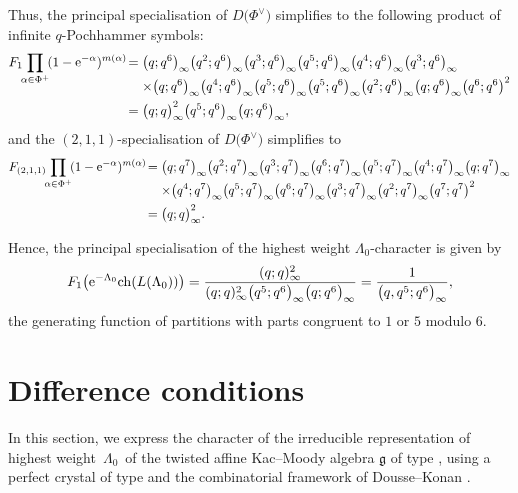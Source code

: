 \documentclass[10pt,a4paper]{amsart}
\numberwithin{equation}{section}
\theoremstyle{definition}
\begin{document}
Thus, the principal specialisation of $D\bigl(\Phi^\vee\bigr)$ simplifies to the following product of infinite $q$-Pochhammer symbols:
\begin{align*}
F_1\!\! \prod_{\alpha \in \Phi^+}\! (1 - {\rm e}^{-\alpha} )^{m(\alpha)}\!
={}&
\bigl(q;q^6\bigr)_{\infty} \bigl(q^2;q^6\bigr)_{\infty} \bigl(q^3;q^6\bigr)_{\infty} \bigl(q^5;q^6\bigr)_{\infty} \bigl(q^4;q^6\bigr)_{\infty} \bigl(q^3;q^6\bigr)_{\infty} \\[-2.3ex]
&{}{\times}  \bigl(q;q^6\bigr)_{\infty} \bigl(q^4;q^6\bigr)_{\infty} \bigl(q^5;q^6\bigr)_{\infty} \bigl(q^5;q^6\bigr)_{\infty} \bigl(q^2;q^6\bigr)_{\infty} \bigl(q;q^6\bigr)_{\infty} \bigl(q^6;q^6\bigr)^2 \\
={}&
\bigl(q;q\bigr)_{\infty}^2 \bigl(q^5;q^6\bigr)_{\infty} \bigl(q;q^6\bigr)_{\infty},
\end{align*}
and the $(2,1,1)$-specialisation of $D\bigl(\Phi^\vee\bigr)$ simplifies to
\begin{align*}
F_{(2,1,1)}\!\! \prod_{\alpha \in \Phi^+}\! (1 - {\rm e}^{-\alpha})^{m(\alpha)}
\!={}&
\bigl(q;q^7\bigr)_{\infty} \bigl(q^2;q^7\bigr)_{\infty} \bigl(q^3;q^7\bigr)_{\infty} \bigl(q^6;q^7\bigr)_{\infty} \bigl(q^5;q^7\bigr)_{\infty} \bigl(q^4;q^7\bigr)_{\infty} \bigl(q;q^7\bigr)_{\infty} \\[-2.3ex]
&{}{\times}  \bigl(q^4;q^7\bigr)_{\infty} \bigl(q^5;q^7\bigr)_{\infty} \bigl(q^6;q^7\bigr)_{\infty} \bigl(q^3;q^7\bigr)_{\infty} \bigl(q^2;q^7\bigr)_{\infty} \bigl(q^7;q^7\bigr)^2 \\
={}&
\bigl(q;q\bigr)_{\infty}^2.
\end{align*}

Hence, the principal specialisation of the highest weight $\Lambda_0$-character is given by
\begin{align}\label{eq:cong_cond}
 F_1\bigl({\rm e}^{-\Lambda_0}\mathrm{ch} (L(\Lambda_0) )\bigr) = \frac{(q;q)_{\infty}^2}{(q;q)_{\infty}^2\bigl(q^5;q^6\bigr)_{\infty}\bigl(q;q^6\bigr)_{\infty}}= \frac{1}{\bigl(q,q^5;q^6\bigr)_{\infty}},
\end{align}
the generating function of partitions with parts congruent to $1$ or $5$ modulo $6$.


\section{Difference conditions}\label{section:difference}

In this section, we express the character of the irreducible representation of highest weight~$\Lambda_0$~of the twisted affine Kac--Moody algebra $\mathfrak{g}$ of type , using a perfect crystal of type  and the combinatorial framework of Dousse--Konan \cite{DK19b,DK22}.
\end{document}
